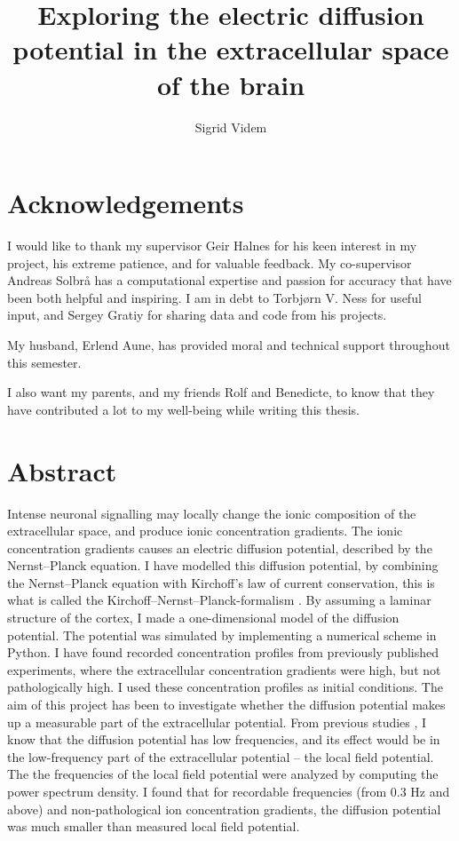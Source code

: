 \documentclass{uiophd}
\author{Sigrid Videm}
\title{Exploring the electric diffusion potential in the extracellular space of the brain}
\begin{document}
\frontmatter
\maketitle
\chapter*{Acknowledgements}
I would like to thank my supervisor Geir Halnes for his keen interest in my project, his extreme patience, and for valuable feedback. My co-supervisor Andreas Solbrå has a computational expertise and passion for accuracy that have been both helpful and inspiring. I am in debt to Torbjørn V. Ness for useful input, and Sergey Gratiy for sharing data and code from his projects.

My husband, Erlend Aune, has provided moral and technical support throughout this semester.

I also want my parents, and my friends Rolf and Benedicte, to know that they  have contributed a lot to my well-being while writing this thesis. 

\chapter*{Abstract} 
Intense neuronal signalling may locally change the ionic composition of the extracellular space, and produce ionic concentration gradients. The ionic concentration gradients causes an electric diffusion potential, described by the Nernst--Planck equation. I have modelled this diffusion potential, by combining the Nernst--Planck equation with Kirchoff's law of current conservation, this is what is called the Kirchoff--Nernst--Planck-formalism \cite{Halnes2013}\cite{Halnes2016}. By assuming a laminar structure of the cortex, I made a one-dimensional model of the diffusion potential. The potential was simulated by implementing a numerical scheme in Python. I have found recorded concentration profiles from previously published experiments, where the extracellular concentration gradients were high, but not pathologically high. I used these concentration profiles as initial conditions. The aim of this project has been to investigate whether the diffusion potential makes up a measurable part of the extracellular potential. From previous studies \cite{Halnes2016}\cite{Gratiy2017}, I know that the diffusion potential has low frequencies, and its effect would be in the low-frequency part of the extracellular potential -- the local field potential. The the frequencies of the local field potential were analyzed by computing the power spectrum density. I found that for recordable frequencies (from 0.3 Hz and above) and non-pathological ion concentration gradients, the diffusion potential was much smaller than measured local field potential. 
\end{document}
